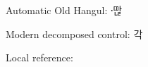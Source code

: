 \documentclass{article}
\begin{document}
Automatic Old Hangul: ꥠᅡퟋ〮

Modern decomposed control: 각

Local reference: 
\end{document}
